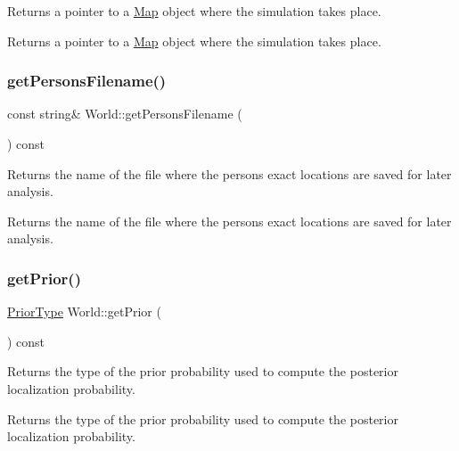 Returns a pointer to a \hyperlink{class_map}{Map} object where the simulation takes place. \begin{DoxyReturn}{Returns}
a pointer to a \hyperlink{class_map}{Map} object where the simulation takes place. 
\end{DoxyReturn}
\mbox{\label{class_world_a206508d427e13c242855d9e11e5bed72}} 
\subsubsection{\texorpdfstring{get\+Persons\+Filename()}{getPersonsFilename()}}
{\footnotesize\ttfamily const string\& World\+::get\+Persons\+Filename (\begin{DoxyParamCaption}{ }\end{DoxyParamCaption}) const}

Returns the name of the file where the persons exact locations are saved for later analysis. \begin{DoxyReturn}{Returns}
the name of the file where the persons exact locations are saved for later analysis. 
\end{DoxyReturn}
\mbox{\label{class_world_a9d7c2f5e7d357b891fac1728a932885f}} 
\subsubsection{\texorpdfstring{get\+Prior()}{getPrior()}}
{\footnotesize\ttfamily \hyperlink{_prior_type_8h_a61286c562e68de246982fc393a7c23a5}{Prior\+Type} World\+::get\+Prior (\begin{DoxyParamCaption}{ }\end{DoxyParamCaption}) const}

Returns the type of the prior probability used to compute the posterior localization probability. \begin{DoxyReturn}{Returns}
the type of the prior probability used to compute the posterior localization probability. 
\end{DoxyReturn}
\mbox{\label{class_world_a026bdf1e190cdaf02481c548b8ca1a6f}} 
